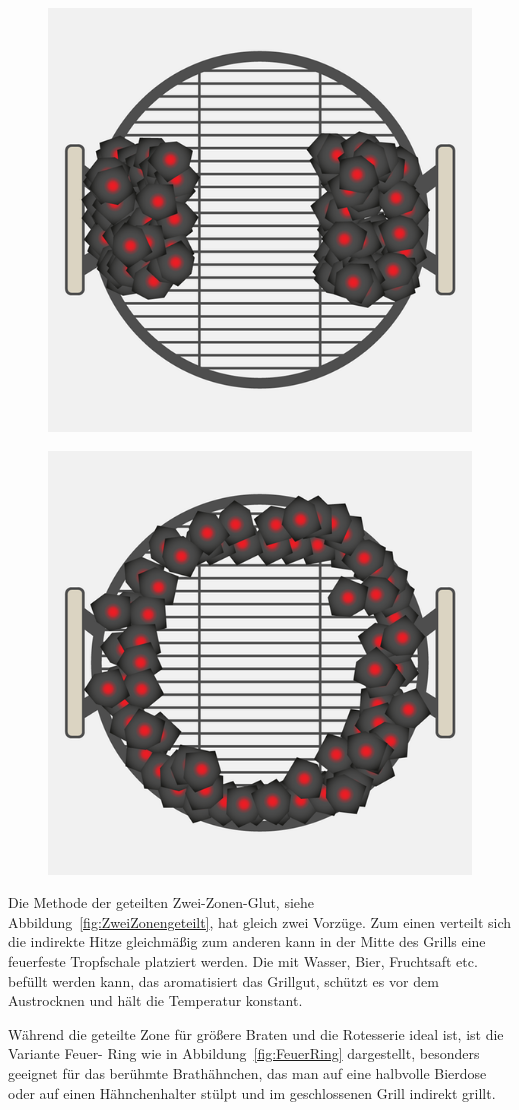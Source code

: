 \begin{figure}[htbp]
	\centering
	\begin{minipage}{.5\textwidth}
		\centering
		\includegraphics[width=.5\linewidth]{pics/ZweiZonengeteilt}
		\label{fig:ZweiZonengeteilt}
	\end{minipage}%
	\begin{minipage}{.5\textwidth}
		\centering
		\includegraphics[width=.5\linewidth]{pics/FeuerRing}
		\label{fig:FeuerRing}
	\end{minipage}%
\end{figure}

	Die Methode der geteilten Zwei-Zonen-Glut, siehe 
	Abbildung~\vref{fig:ZweiZonengeteilt}, hat gleich zwei Vorzüge. Zum 
	einen verteilt sich
	die indirekte Hitze gleichmäßig zum anderen kann in der Mitte des Grills eine 
	feuerfeste Tropfschale platziert werden. Die mit 
	Wasser, Bier, 
	Fruchtsaft etc. befüllt werden kann, das aromatisiert das Grillgut, schützt es 
	vor dem Austrocknen und hält die Temperatur 
	konstant.
	
	Während die geteilte Zone für größere Braten und die Rotesserie ideal ist, ist 
	die Variante Feuer- Ring wie in 
	Abbildung~\vref{fig:FeuerRing}
	dargestellt, besonders geeignet für das berühmte Brathähnchen, das man auf 
	eine halbvolle Bierdose oder auf einen 
	Hähnchenhalter stülpt
	und im geschlossenen Grill indirekt grillt.

